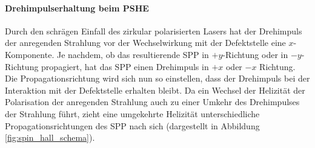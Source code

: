 \documentclass[titlepage,  ngerman]{article}
\begin{document}
	\paragraph{Drehimpulserhaltung beim PSHE}
	Durch den schrägen Einfall des zirkular polarisierten Lasers hat der Drehimpuls der anregenden Strahlung vor der Wechselwirkung mit der Defektstelle eine $x$-Komponente. Je nachdem, ob das resultierende SPP in $+y$-Richtung oder in $-y$-Richtung propagiert, hat das SPP einen Drehimpuls in  $+x$ oder $-x$ Richtung. Die Propagationsrichtung wird sich nun so einstellen, dass der Drehimpuls bei der Interaktion mit der Defektstelle erhalten bleibt. Da ein Wechsel der Helizität der Polarisation der anregenden Strahlung auch zu einer Umkehr des Drehimpulses der Strahlung führt, zieht eine umgekehrte Helizität unterschiedliche Propagationsrichtungen des SPP nach sich (dargestellt in Abbildung \ref{fig:spin_hall_schema}).
\end{document}
